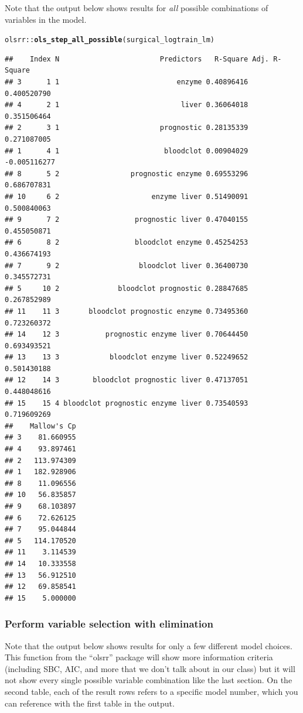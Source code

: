 \documentclass{article}\usepackage[]{graphicx}\usepackage[]{color}
\makeatletter
\newcommand{\hlopt}[1]{\textcolor[rgb]{0,0,0}{#1}}%
\newcommand{\hlstd}[1]{\textcolor[rgb]{0.345,0.345,0.345}{#1}}%
\newcommand{\hlkwd}[1]{\textcolor[rgb]{0.737,0.353,0.396}{\textbf{#1}}}%
\newenvironment{kframe}{%
 \def\at@end@of@kframe{}%
 \ifinner\ifhmode%
  \def\at@end@of@kframe{\end{minipage}}%
  \begin{minipage}{\columnwidth}%
 \fi\fi%
 \def\FrameCommand##1{\hskip\@totalleftmargin \hskip-\fboxsep
 \colorbox{shadecolor}{##1}\hskip-\fboxsep
     \hskip-\linewidth \hskip-\@totalleftmargin \hskip\columnwidth}%
 \MakeFramed {\advance\hsize-\width
   \@totalleftmargin\z@ \linewidth\hsize
   \@setminipage}}%
 {\par\unskip\endMakeFramed%
 \at@end@of@kframe}
\newenvironment{knitrout}{}{} %
\makeatother
\begin{document}
Note that the output below shows results for \textit{all} possible combinations of variables in the model.

\begin{knitrout}
\color{fgcolor}\begin{kframe}
\begin{alltt}
\hlstd{olsrr}\hlopt{::}\hlkwd{ols_step_all_possible}\hlstd{(surgical_logtrain_lm)}
\end{alltt}
\begin{verbatim}
##    Index N                        Predictors   R-Square Adj. R-Square
## 3      1 1                            enzyme 0.40896416   0.400520790
## 4      2 1                             liver 0.36064018   0.351506464
## 2      3 1                        prognostic 0.28135339   0.271087005
## 1      4 1                         bloodclot 0.00904029  -0.005116277
## 8      5 2                 prognostic enzyme 0.69553296   0.686707831
## 10     6 2                      enzyme liver 0.51490091   0.500840063
## 9      7 2                  prognostic liver 0.47040155   0.455050871
## 6      8 2                  bloodclot enzyme 0.45254253   0.436674193
## 7      9 2                   bloodclot liver 0.36400730   0.345572731
## 5     10 2              bloodclot prognostic 0.28847685   0.267852989
## 11    11 3       bloodclot prognostic enzyme 0.73495360   0.723260372
## 14    12 3           prognostic enzyme liver 0.70644450   0.693493521
## 13    13 3            bloodclot enzyme liver 0.52249652   0.501430188
## 12    14 3        bloodclot prognostic liver 0.47137051   0.448048616
## 15    15 4 bloodclot prognostic enzyme liver 0.73540593   0.719609269
##    Mallow's Cp
## 3    81.660955
## 4    93.897461
## 2   113.974309
## 1   182.928906
## 8    11.096556
## 10   56.835857
## 9    68.103897
## 6    72.626125
## 7    95.044844
## 5   114.170520
## 11    3.114539
## 14   10.333558
## 13   56.912510
## 12   69.858541
## 15    5.000000
\end{verbatim}
\end{kframe}
\end{knitrout}

\subsubsection*{Perform variable selection with elimination}

Note that the output below shows results for only a few different model choices. This function from the ``olsrr'' package will show more information criteria (including SBC, AIC, and more that we don't talk about in our class) but it will not show every single possible variable combination like the last section. On the second table, each of the result rows refers to a specific model number, which you can reference with the first table in the output.
\end{document}
